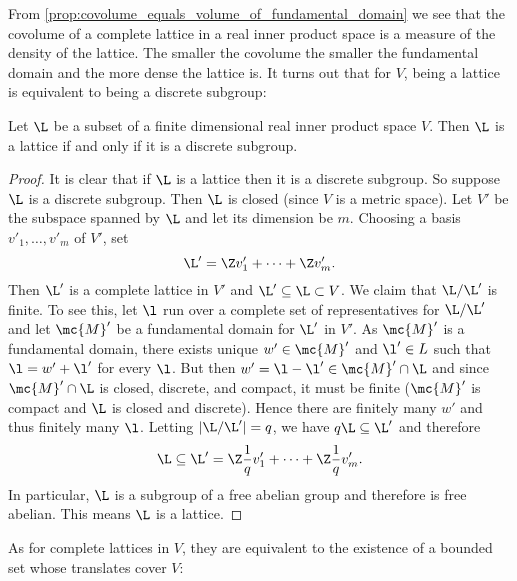     From \cref{prop:covolume_equals_volume_of_fundamental_domain} we see that the covolume of a complete lattice in a real inner product space is a measure of the density of the lattice. The smaller the covolume the smaller the fundamental domain and the more dense the lattice is. It turns out that for $V$, being a lattice is equivalent to being a discrete subgroup:

    \begin{proposition}\label{prop:lattice_if_and_only_if_discrete_subgroup}
      Let $\L$ be a subset of a finite dimensional real inner product space $V$. Then $\L$ is a lattice if and only if it is a discrete subgroup.
    \end{proposition}
    \begin{proof}
      It is clear that if $\L$ is a lattice then it is a discrete subgroup. So suppose $\L$ is a discrete subgroup. Then $\L$ is closed (since $V$ is a metric space). Let $V'$ be the subspace spanned by $\L$ and let its dimension be $m$. Choosing a basis $v'_{1},\ldots,v'_{m}$ of $V'$, set
      \[
        \L' = \Z v'_{1}+\cdots+\Z v'_{m}.
      \]
      Then $\L'$ is a complete lattice in $V'$ and $\L' \subseteq \L \subset V$. We claim that $\L/\L'$ is finite. To see this, let $\l$ run over a complete set of representatives for $\L/\L'$ and let $\mc{M}'$ be a fundamental domain for $\L'$ in $V'$. As $\mc{M}'$ is a fundamental domain, there exists unique $w' \in \mc{M}'$ and $\l' \in L$ such that $\l = w'+\l'$ for every $\l$. But then $w' = \l-\l' \in \mc{M}' \cap \L$ and since $\mc{M}' \cap \L$ is closed, discrete, and compact, it must be finite ($\mc{M}'$ is compact and $\L$ is closed and discrete). Hence there are finitely many $w'$ and thus finitely many $\l$. Letting $|\L/\L'| = q$, we have $q\L \subseteq \L'$ and therefore
      \[
        \L \subseteq \L' = \Z\frac{1}{q}v'_{1}+\cdots+\Z\frac{1}{q}v'_{m}.
      \]
      In particular, $\L$ is a subgroup of a free abelian group and therefore is free abelian. This means $\L$ is a lattice.
    \end{proof}

    As for complete lattices in $V$, they are equivalent to the existence of a bounded set whose translates cover $V$:

